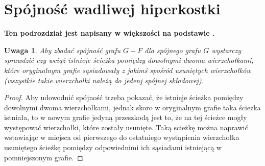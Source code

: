 \documentclass{pracamgr}
\newtheorem{remark}[theorem]{Uwaga}
\begin{document}
  \section{Spójność wadliwej hiperkostki}
   \textbf{Ten podrozdział jest napisany w większości na podstawie \cite{DFGKR}.}
   \begin{remark}\label{spojnosc przy usunietych}
    Aby zbadać spójność grafu $G-F$ dla spójnego grafu $G$ wystarczy sprawdzić czy wciąż istnieje ścieżka pomiędzy dowolnymi dwoma wierzchołkami,
    które oryginalnym grafie sąsiadowały z jakimś spośród usuniętych wierzchołków (wszystkie takie wierzchołki należą do jedenj spójnej składowej).
   \end{remark}
   \begin{proof}
    Aby udowodnić spójność trzeba pokazać, że istnieje ścieżka pomiędzy dowolnymi dwoma wierzchołkami, jednak skoro w oryginalnym grafie taka ścieżka istniała,
    to w nowym grafie jedyną przeszkodą jest to, że na tej ścieżce mogły występować wierzchołki, które zostały usunięte. Taką scieżkę można naprawić wstawiając
    w miejsca od pierwszego do ostatniego wystąpienia wierzchołka usuniętego ścieżkę pomiędzy odpowiednimi ich sąsiadami istniejącą w pomniejszonym grafie.
   \end{proof}
\end{document}
